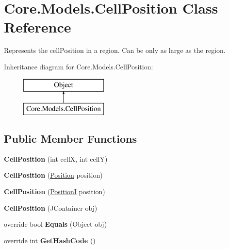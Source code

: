 \hypertarget{classCore_1_1Models_1_1CellPosition}{\section{Core.\-Models.\-Cell\-Position Class Reference}
\label{classCore_1_1Models_1_1CellPosition}
}


Represents the cell\-Position in a region. Can be only as large as the region.  


Inheritance diagram for Core.\-Models.\-Cell\-Position\-:\begin{figure}[H]
\begin{center}
\leavevmode
\includegraphics[height=2.000000cm]{classCore_1_1Models_1_1CellPosition}
\end{center}
\end{figure}
\subsection*{Public Member Functions}
\begin{DoxyCompactItemize}
\item 
\hypertarget{classCore_1_1Models_1_1CellPosition_a41b20ccc07f94d036b2aafe9e1830aff}{{\bfseries Cell\-Position} (int cell\-X, int cell\-Y)}\label{classCore_1_1Models_1_1CellPosition_a41b20ccc07f94d036b2aafe9e1830aff}

\item 
\hypertarget{classCore_1_1Models_1_1CellPosition_a6ed85706fc84bcfd93af2efddfebe968}{{\bfseries Cell\-Position} (\hyperlink{classCore_1_1Models_1_1Position}{Position} position)}\label{classCore_1_1Models_1_1CellPosition_a6ed85706fc84bcfd93af2efddfebe968}

\item 
\hypertarget{classCore_1_1Models_1_1CellPosition_ae5a3eb2be34e2e06b8c0addc808e902e}{{\bfseries Cell\-Position} (\hyperlink{classCore_1_1Models_1_1PositionI}{Position\-I} position)}\label{classCore_1_1Models_1_1CellPosition_ae5a3eb2be34e2e06b8c0addc808e902e}

\item 
\hypertarget{classCore_1_1Models_1_1CellPosition_a13d336fb05024daba699cdfb71bd9df2}{{\bfseries Cell\-Position} (J\-Container obj)}\label{classCore_1_1Models_1_1CellPosition_a13d336fb05024daba699cdfb71bd9df2}

\item 
\hypertarget{classCore_1_1Models_1_1CellPosition_afa3430bbcfc6b9a0bcf9340765773658}{override bool {\bfseries Equals} (Object obj)}\label{classCore_1_1Models_1_1CellPosition_afa3430bbcfc6b9a0bcf9340765773658}

\item 
\hypertarget{classCore_1_1Models_1_1CellPosition_a29ab23b29f230954c4277b0f9ad74000}{override int {\bfseries Get\-Hash\-Code} ()}\label{classCore_1_1Models_1_1CellPosition_a29ab23b29f230954c4277b0f9ad74000}

\end{DoxyCompactItemize}
